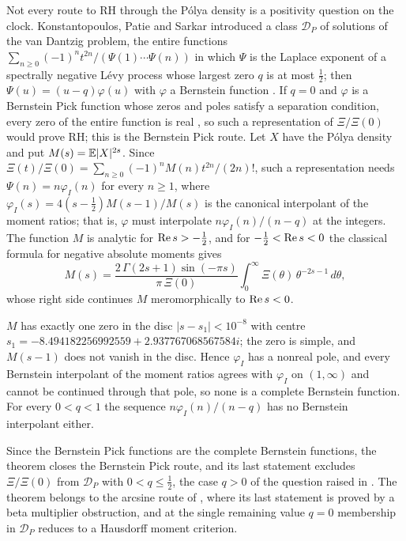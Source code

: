 Not every route to RH through the P\'olya density is a positivity question on the clock. Konstantopoulos, Patie and Sarkar \cite{KPS24} introduced a class $\mathcal D_P$ of solutions of the van Dantzig problem, the entire functions $\sum_{n\ge0}(-1)^nt^{2n}/(\Psi(1)\cdots\Psi(n))$ in which $\Psi$ is the Laplace exponent of a spectrally negative L\'evy process whose largest zero $q$ is at most $\frac12$; then $\Psi(u)=(u-q)\varphi(u)$ with $\varphi$ a Bernstein function \cite[Proposition 5.2]{KPS24}. If $q=0$ and $\varphi$ is a Bernstein Pick function whose zeros and poles satisfy a separation condition, every zero of the entire function is real \cite[Theorem 4.4]{KPS24}, so such a representation of $\Xi/\Xi(0)$ would prove RH; this is the Bernstein Pick route. Let $X$ have the P\'olya density and put $M(s)=\mathbb{E}|X|^{2s}$. Since $\Xi(t)/\Xi(0)=\sum_{n\ge0}(-1)^nM(n)t^{2n}/(2n)!$, such a representation needs $\Psi(n)=n\varphi_I(n)$ for every $n\ge1$, where $\varphi_I(s)=4(s-\frac12)M(s-1)/M(s)$ is the canonical interpolant of the moment ratios; that is, $\varphi$ must interpolate $n\varphi_I(n)/(n-q)$ at the integers. The function $M$ is analytic for $\operatorname{Re} s>-\frac12$, and for $-\frac12<\operatorname{Re} s<0$ the classical formula for negative absolute moments gives
\[
M(s)=\frac{2\,\Gamma(2s+1)\sin(-\pi s)}{\pi\,\Xi(0)}\int_0^\infty\Xi(\theta)\,\theta^{-2s-1}\,d\theta ,
\]
whose right side continues $M$ meromorphically to $\operatorname{Re} s<0$.

\begin{theorem}[{\cite[Theorem E]{P17}}]\label{thm:ch13:mellin}
$M$ has exactly one zero in the disc $|s-s_1|<10^{-8}$ with centre $s_1=-8.494182256992559+2.937767068567584i$; the zero is simple, and $M(s-1)$ does not vanish in the disc. Hence $\varphi_I$ has a nonreal pole, and every Bernstein interpolant of the moment ratios agrees with $\varphi_I$ on $(1,\infty)$ and cannot be continued through that pole, so none is a complete Bernstein function. For every $0<q<1$ the sequence $n\varphi_I(n)/(n-q)$ has no Bernstein interpolant either.
\end{theorem}

Since the Bernstein Pick functions are the complete Bernstein functions, the theorem closes the Bernstein Pick route, and its last statement excludes $\Xi/\Xi(0)$ from $\mathcal D_P$ with $0<q\le\frac12$, the case $q>0$ of the question raised in \cite[Section 4.1]{KPS24}. The theorem belongs to the arcsine route of \cite[Chapter 12]{P26}, where its last statement is proved by a beta multiplier obstruction, and at the single remaining value $q=0$ membership in $\mathcal D_P$ reduces to a Hausdorff moment criterion.

